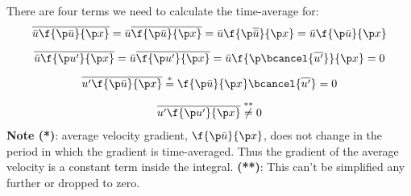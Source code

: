 %
There are four terms we need to calculate the time-average for:
%
\begin{equation}
  \begin{gathered}
    \overline{\bar{u} \f{\p \bar{u}}{\p x}}
    = \bar{u} \overline{\f{\p \bar{u}}{\p x}}
    = \bar{u} \f{\p \overline{\bar{u}}}{\p x}
    = \bar{u} \f{\p \bar{u}}{\p x} \\[5pt]
    \overline{\bar{u} \f{\p u^\prime}{\p x}}
    = \bar{u} \overline{\f{\p u^\prime}{\p x}}
    = \bar{u} \f{\p \bcancel{\overline{u^\prime}}}{\p x}
    = 0 \\[5pt]
    \overline{u^\prime \f{\p \bar{u}}{\p x}}
    \overset{*}{=} \f{\p \bar{u}}{\p x} \bcancel{\overline{u^\prime}} = 0 \\[5pt]
    \overline{u^\prime \f{\p u^\prime}{\p x}} \overset{**}{\neq} 0
  \end{gathered}
  \label{eq:NS-time-averaged-rhs-nonlinear-first-term-x-expanded}
\end{equation}
%
\textbf{Note (*)}: average velocity gradient, \(\f{\p \bar{u}}{\p x}\), does not change in the period in which the gradient is time-averaged.
Thus the gradient of the average velocity is a constant term inside the integral.
%
\textbf{(**)}: This can't be simplified any further or dropped to zero.
%

